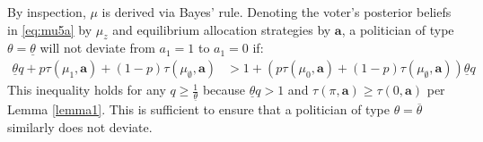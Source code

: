\documentclass[11pt,english]{article}
\begin{document}
By inspection, $\mu$ is derived via Bayes' rule. Denoting the voter's posterior beliefs in \eqref{eq:mu5a} by $\mu_z$ and equilibrium allocation strategies by $\boldsymbol{a}$, a politician of type $\theta = \underline{\theta}$ will not deviate from $a_1 = 1$ to $a_1 = 0$ if:
\begin{align*}
\underline{\theta}q + p\tau(\mu_1, \boldsymbol{a})+ (1-p)\tau(\mu_\emptyset,\boldsymbol{a})&>1 + (p\tau(\mu_0, \boldsymbol{a}) + (1-p) \tau(\mu_\emptyset, \boldsymbol{a}))\underline{\theta}q
\end{align*}
\noindent This inequality holds for any $q \geq \frac{1}{\underline{\theta}}$ because $\underline{\theta}q > 1$ and $\tau(\pi, \boldsymbol{a}) \geq \tau(0, \boldsymbol{a})$ per Lemma \ref{lemma1}. This is sufficient to ensure that a politician of type $\theta = \overline{\theta}$ similarly does not deviate. \\
\end{document}
